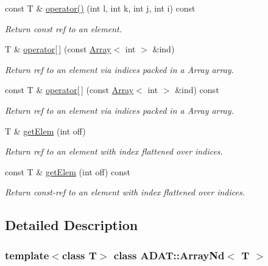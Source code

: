 \begin{DoxyCompactItemize}
const T \& \mbox{\hyperlink{classADAT_1_1ArrayNd_aa2f8e4f6fa9a05745538791ba4f70aff}{operator()}} (int l, int k, int j, int i) const
\begin{DoxyCompactList}\small\item\em Return const ref to an element. \end{DoxyCompactList}\item 
T \& \mbox{\hyperlink{classADAT_1_1ArrayNd_a5689e9a64be5914877dc3882cc68a283}{operator\mbox{[}$\,$\mbox{]}}} (const \mbox{\hyperlink{classXMLArray_1_1Array}{Array}}$<$ int $>$ \&ind)
\begin{DoxyCompactList}\small\item\em Return ref to an element via indices packed in a Array array. \end{DoxyCompactList}\item 
const T \& \mbox{\hyperlink{classADAT_1_1ArrayNd_a3b7160cbd3939f68f4a23df8cc56d2df}{operator\mbox{[}$\,$\mbox{]}}} (const \mbox{\hyperlink{classXMLArray_1_1Array}{Array}}$<$ int $>$ \&ind) const
\begin{DoxyCompactList}\small\item\em Return ref to an element via indices packed in a Array array. \end{DoxyCompactList}\item 
T \& \mbox{\hyperlink{classADAT_1_1ArrayNd_abc5c56420a9625b236d4521acb083de2}{get\+Elem}} (int off)
\begin{DoxyCompactList}\small\item\em Return ref to an element with index flattened over indices. \end{DoxyCompactList}\item 
const T \& \mbox{\hyperlink{classADAT_1_1ArrayNd_a515368f71387996ee237309eb1f0cc2e}{get\+Elem}} (int off) const
\begin{DoxyCompactList}\small\item\em Return const-\/ref to an element with index flattened over indices. \end{DoxyCompactList}\end{DoxyCompactItemize}


\subsection{Detailed Description}
\subsubsection*{template$<$class T$>$\newline
class A\+D\+A\+T\+::\+Array\+Nd$<$ T $>$}

